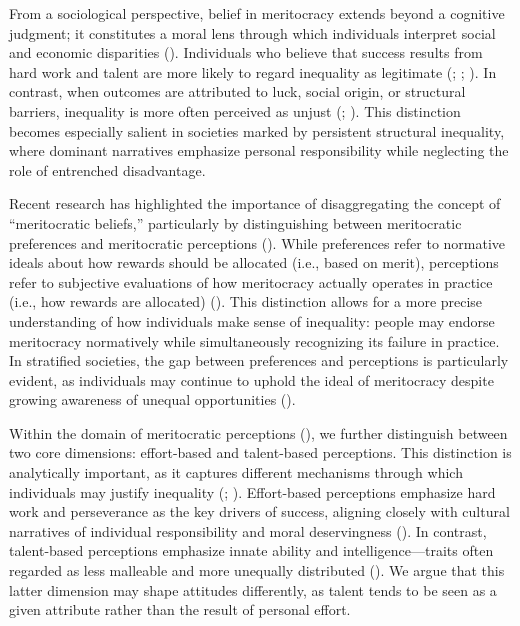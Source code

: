 \documentclass[
  12pt,
]{article}
\begin{document}
From a sociological perspective, belief in meritocracy extends beyond a
cognitive judgment; it constitutes a moral lens through which
individuals interpret social and economic disparities
(). Individuals who believe
that success results from hard work and talent are more likely to regard
inequality as legitimate (; ; ). In contrast, when outcomes are attributed to luck,
social origin, or structural barriers, inequality is more often
perceived as unjust (; ). This distinction becomes especially salient in societies
marked by persistent structural inequality, where dominant narratives
emphasize personal responsibility while neglecting the role of
entrenched disadvantage.

Recent research has highlighted the importance of disaggregating the
concept of ``meritocratic beliefs,'' particularly by distinguishing
between meritocratic preferences and meritocratic perceptions
().
While preferences refer to normative ideals about how rewards should be
allocated (i.e., based on merit), perceptions refer to subjective
evaluations of how meritocracy actually operates in practice (i.e., how
rewards are allocated) (). This distinction allows for a more precise understanding of how
individuals make sense of inequality: people may endorse meritocracy
normatively while simultaneously recognizing its failure in practice. In
stratified societies, the gap between preferences and perceptions is
particularly evident, as individuals may continue to uphold the ideal of
meritocracy despite growing awareness of unequal opportunities
().

Within the domain of meritocratic perceptions
(),
we further distinguish between two core dimensions: effort-based and
talent-based perceptions. This distinction is analytically important, as
it captures different mechanisms through which individuals may justify
inequality (; ). Effort-based
perceptions emphasize hard work and perseverance as the key drivers of
success, aligning closely with cultural narratives of individual
responsibility and moral deservingness
(). In contrast,
talent-based perceptions emphasize innate ability and
intelligence---traits often regarded as less malleable and more
unequally distributed (). We
argue that this latter dimension may shape attitudes differently, as
talent tends to be seen as a given attribute rather than the result of
personal effort.
\end{document}
